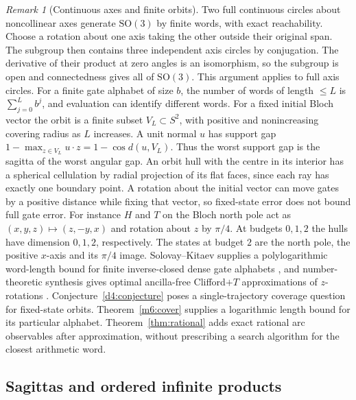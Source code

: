 \documentclass[11pt,reqno]{amsart}
\theoremstyle{definition}
\theoremstyle{remark}
\newtheorem{remark}[theorem]{Remark}
\numberwithin{equation}{section}
\newcommand{\SO}{\mathrm{SO}}
\begin{document}
\begin{remark}[Continuous axes and finite orbits]\label{m6:finite-gates}
Two full continuous circles about noncollinear axes generate
\(\SO(3)\) by finite words, with exact reachability. Choose a
rotation about one axis taking the other outside their original
span. The subgroup then contains three independent axis circles
by conjugation. The derivative of their product at zero angles
is an isomorphism, so the subgroup is open and connectedness gives
all of \(\SO(3)\). This argument applies to full axis circles.
For a finite gate alphabet of size \(b\), the number of words of
length \(\le L\) is \(\sum_{j=0}^L b^j\), and evaluation can identify
different words. For a fixed initial Bloch vector the orbit is a
finite subset \(V_L\subset S^2\), with positive and nonincreasing
covering radius as \(L\) increases. A unit normal \(u\) has support
gap \(1-\max_{z\in V_L}u\cdot z=1-\cos d(u,V_L)\). Thus the
worst support gap is the sagitta of the worst angular gap.
An orbit hull with the centre in its interior has a spherical
cellulation by radial projection of its flat faces, since each
ray has exactly one boundary point. A rotation about the initial
vector can move gates by a positive distance while fixing that
vector, so fixed-state error does not bound full gate error.
For instance \(H\) and \(T\) on the Bloch north pole act as
\((x,y,z)\mapsto(z,-y,x)\) and rotation about \(z\) by \(\pi/4\).
At budgets \(0,1,2\) the hulls have dimension \(0,1,2\),
respectively. The states at budget \(2\) are the north pole,
the positive \(x\)-axis and its \(\pi/4\) image.
Solovay--Kitaev supplies a polylogarithmic word-length bound for
finite inverse-closed dense gate alphabets \cite{d4-dawson}, and number-theoretic synthesis gives optimal ancilla-free Clifford$+T$
approximations of $z$-rotations \cite{m6:RS}.
Conjecture~\ref{d4:conjecture} poses a single-trajectory coverage
question for fixed-state orbits.
Theorem~\ref{m6:cover} supplies a logarithmic length bound for its
particular alphabet. Theorem~\ref{thm:rational} adds exact rational
arc observables after approximation, without prescribing a search
algorithm for the closest arithmetic word.
\end{remark}

\subsection{Sagittas and ordered infinite products}
\end{document}
